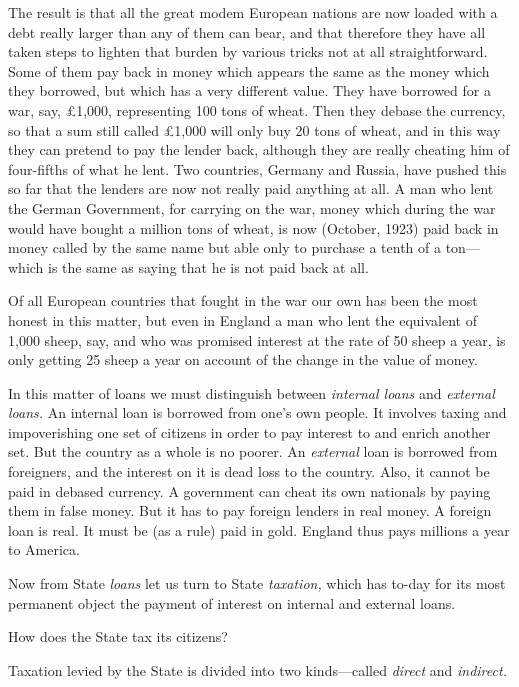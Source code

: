 \documentclass{book}
\begin{document}
The result is that all the great modem European nations are now loaded with a debt really larger than any of them can bear, and that therefore they have all taken steps to lighten that burden by various tricks not at all straightforward. Some of them pay back in money which appears the same as the money which they borrowed, but which has a very different value. They have borrowed for a war, say, £1,000, representing 100 tons of wheat. Then they debase the currency, so that a sum still called £1,000 will only buy 20 tons of wheat, and in this way they can pretend to pay the lender back, although they are really cheating him of four-fifths of what he lent. Two countries, Germany and Russia, have pushed this so far that the lenders are now not really paid anything at all. A man who lent the German Government, for carrying on the war, money which during the war would have bought a million tons of wheat, is now (October, 1923) paid back in money called by the same name but able only to purchase a tenth of a ton—which is the same as saying that he is not paid back at all.

Of all European countries that fought in the war our own has been the most honest in this matter, but even in England a man who lent the equivalent of 1,000 sheep, say, and who was promised interest at the rate of 50 sheep a year, is only getting 25 sheep a year on account of the change in the value of money.

In this matter of loans we must distinguish between \emph{internal loans} and \emph{external loans.} An internal loan is borrowed from one’s own people. It involves taxing and impoverishing one set of citizens in order to pay interest to and enrich another set. But the country as a whole is no poorer. An \emph{external} loan is borrowed from foreigners, and the interest on it is dead loss to the country. Also, it cannot be paid in debased currency. A government can cheat its own nationals by paying them in false money. But it has to pay foreign lenders in real money. A foreign loan is real. It must be (as a rule) paid in gold. England thus pays millions a year to America.

Now from State \emph{loans} let us turn to State \emph{taxation,} which has to-day for its most permanent object the payment of interest on internal and external loans.

How does the State tax its citizens?

Taxation levied by the State is divided into two kinds—called \emph{direct} and \emph{indirect.}
\end{document}
